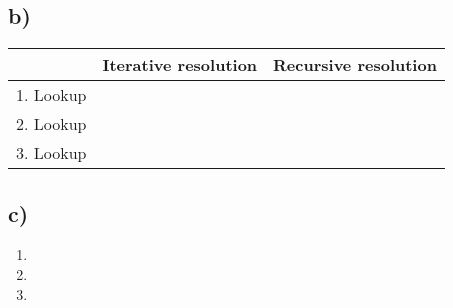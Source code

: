 \documentclass{scrartcl}
\begin{document}
\subsection*{b)}
\begin{table}[!ht]
	\centering
	\begin{tabular}{|l|l|l|}
		\hline
		& Iterative resolution & Recursive resolution \\ \hline
		1. Lookup &  &  \\ \hline
		2. Lookup &  &  \\ \hline
		3. Lookup &  &  \\ \hline
	\end{tabular}
\end{table}
\subsection*{c)}

\begin{enumerate}[label=(\roman*)]
	\item 
	\item 
	\item 
\end{enumerate}
\end{document}
